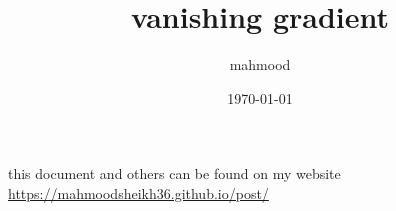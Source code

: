 \documentclass[a4paper,12pt]{article}
\author{mahmood}
\date{\today}
\title{vanishing gradient}
\begin{document}
\maketitle
\begin{note}
this document and others can be found on my website\\
\url{https://mahmoodsheikh36.github.io/post/}
\end{note}
\end{document}
